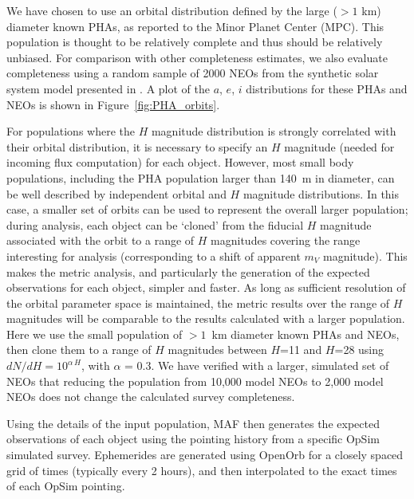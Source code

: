 We have chosen to use an orbital distribution defined by the large ($>1$ km) diameter known PHAs, as reported to the Minor Planet Center (MPC). This population is thought to be relatively complete and thus should be relatively unbiased. For comparison with other completeness estimates, we also evaluate completeness using a random sample of 2000 NEOs from the synthetic solar system model presented in \cite{Grav2011}.  A plot of the $a$, $e$, $i$ distributions for these PHAs and NEOs is shown in Figure~\ref{fig:PHA_orbits}.

For populations where the $H$ magnitude distribution is strongly correlated with their orbital distribution,
it is necessary to specify an $H$ magnitude (needed for incoming flux computation) for each object. However, most small body populations, including the PHA population larger than 140~m in diameter, can be well described by independent orbital and $H$ magnitude distributions. In this case, a smaller set of orbits can be used to represent the overall larger population; during analysis, each object can be `cloned' from the fiducial $H$ magnitude associated with the orbit to a range of $H$ magnitudes covering the range interesting for analysis (corresponding to a shift of apparent $m_V$ magnitude). This makes the metric analysis, and particularly the generation of the expected observations for each object, simpler and faster. As long as sufficient resolution of the orbital parameter space is maintained, the metric results over the range of $H$ magnitudes will be comparable to the results calculated with a larger population. Here we use the small population of $>1$~km diameter known PHAs and NEOs, then clone them to a range of $H$ magnitudes between $H$=11 and $H$=28 using $dN/dH = 10^{\alpha\, H}$, with $\alpha$ = 0.3. We have verified with a larger, simulated set of NEOs that reducing the population from 10,000 model NEOs to 2,000 model NEOs does not change the calculated survey  completeness.

Using the details of the input population, MAF then generates the expected observations of each object using the pointing history
from a specific OpSim simulated survey. Ephemerides are generated using OpenOrb \citep{OpenOrb2009} for a closely spaced grid
of times (typically every 2 hours), and then interpolated to the exact times of each OpSim pointing.


